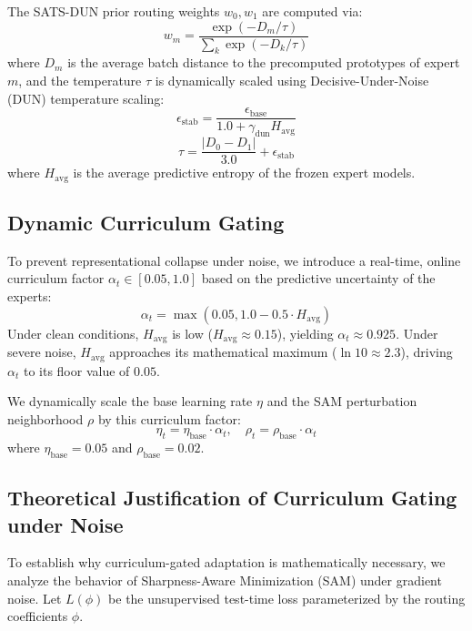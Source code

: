 \documentclass{article}
\theoremstyle{plain}
\theoremstyle{definition}
\theoremstyle{remark}
\begin{document}
The SATS-DUN prior routing weights $w_0, w_1$ are computed via:
\begin{equation}\label{eq:routing_weights}
    w_m = \frac{\exp(-D_m / \tau)}{\sum_k \exp(-D_k / \tau)}
\end{equation}
where $D_m$ is the average batch distance to the precomputed prototypes of expert $m$, and the temperature $\tau$ is dynamically scaled using Decisive-Under-Noise (DUN) temperature scaling:
\begin{equation}
    \epsilon_{\text{stab}} = \frac{\epsilon_{\text{base}}}{1.0 + \gamma_{\text{dun}} H_{\text{avg}}}
\end{equation}
\begin{equation}
    \tau = \frac{|D_0 - D_1|}{3.0} + \epsilon_{\text{stab}}
\end{equation}
where $H_{\text{avg}}$ is the average predictive entropy of the frozen expert models.

\subsection{Dynamic Curriculum Gating}
To prevent representational collapse under noise, we introduce a real-time, online curriculum factor $\alpha_t \in [0.05, 1.0]$ based on the predictive uncertainty of the experts:
\begin{equation}
    \alpha_t = \max(0.05, 1.0 - 0.5 \cdot H_{\text{avg}})
\end{equation}
Under clean conditions, $H_{\text{avg}}$ is low ($H_{\text{avg}} \approx 0.15$), yielding $\alpha_t \approx 0.925$. Under severe noise, $H_{\text{avg}}$ approaches its mathematical maximum ($\ln 10 \approx 2.3$), driving $\alpha_t$ to its floor value of $0.05$.

We dynamically scale the base learning rate $\eta$ and the SAM perturbation neighborhood $\rho$ by this curriculum factor:
\begin{equation}
    \eta_t = \eta_{\text{base}} \cdot \alpha_t, \quad \rho_t = \rho_{\text{base}} \cdot \alpha_t
\end{equation}
where $\eta_{\text{base}} = 0.05$ and $\rho_{\text{base}} = 0.02$.

\subsection{Theoretical Justification of Curriculum Gating under Noise}
To establish why curriculum-gated adaptation is mathematically necessary, we analyze the behavior of Sharpness-Aware Minimization (SAM) under gradient noise. Let $L(\phi)$ be the unsupervised test-time loss parameterized by the routing coefficients $\phi$. 
\end{document}
